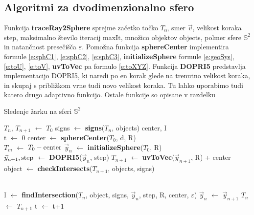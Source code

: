 \documentclass[titlepage]{article}
\begin{document}
\subsection{Algoritmi za dvodimenzionalno sfero}
Funkcija \textbf{traceRay2Sphere} sprejme začetko točko $T_{0}$, smer $\vec{v}$, velikost koraka step, maksimalno število iteracij maxIt, množico objektov objects, polmer sfere $\mathbb{S}^2$ in natančnost presečišča $\varepsilon$. 
Pomožna funkcija \textbf{sphereCenter} implementira formule \eqref{e:sphC1}, \eqref{e:sphC2}, \eqref{e:sphC3}, \textbf{initializeSphere} formule \eqref{e:geoSys}, \eqref{e:toU}, \eqref{e:toV}, \textbf{uvToVec} pa formulo \eqref{e:toXYZ}. Funkcija \textbf{DOPRI5} predstavlja implementacijo DOPRI5, ki naredi po en korak glede na trenutno velikost koraka, in skupaj s približkom vrne tudi novo velikost koraka. Tu lahko uporabimo tudi katero drugo adaptivno funkcijo. Ostale funkcije so opisane v
razdelku 
\begin{algorithm}
    \caption{Sledenje žarku na sferi \(\mathbb{S}^{2}\)}
\begin{algorithmic}

    \State $T_{n}$, $T_{n+1}$ $\gets$ $T_{0}$
    \State signs $\gets$ \textbf{signs}($T_{n}$, objects)
    \State center, I
    \\
    \State t $\gets$ 0
    \State {}
      \State center $\gets$ \textbf{sphereCenter}($T_{0}$, d, R)
      \\
      \State $T_{m}$ $\gets$ $T_{0} - \hbox{center}$
      \State $\vec{y}_{n}$ $\gets$ \textbf{initializeSphere}($T_{0}$, R)
    \EndIf
    \\
    \State $\vec{y}_{n+1}, \hbox{step}$ $\gets$ \textbf{DOPRI5}($\vec{y}_{n}$, step)
    \State $T_{n+1}$ $\gets$ \textbf{uvToVec}($\vec{y}_{n+1}$, R) + center
    \\
    \State object $\gets$ \textbf{checkIntersects}($T_{n+1}$, objects, signs)
    \\
    \\

      \State I $\gets$ \textbf{findIntersection}($T_{n}$, object, signs, $\vec{y}_{n}$, step, R, center, $\varepsilon$)
      \State {}
    \Else
      \State $\vec{y}_{n}$ $\gets$ $\vec{y}_{n+1}$
      \State $T_{n}$ $\gets$ $T_{n+1}$
      \State t $\gets$ t+1
    \EndIf
  \EndWhile
\EndFunction
\end{algorithmic}
\end{algorithm}
\end{document}
